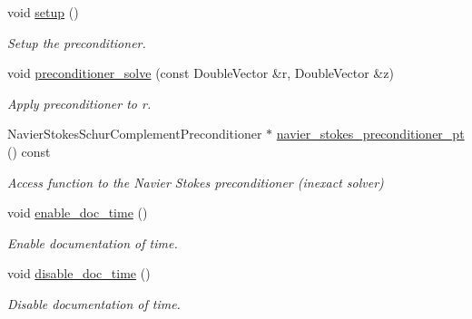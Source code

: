 \begin{DoxyCompactItemize}
void \hyperlink{classoomph_1_1FSIPreconditioner_adadfe9f4332af610b00f1f45d1ad432e}{setup} ()
\begin{DoxyCompactList}\small\item\em Setup the preconditioner. \end{DoxyCompactList}\item 
void \hyperlink{classoomph_1_1FSIPreconditioner_a31c84c3ca19c31488acd0bf2fe333a6b}{preconditioner\+\_\+solve} (const Double\+Vector \&r, Double\+Vector \&z)
\begin{DoxyCompactList}\small\item\em Apply preconditioner to r. \end{DoxyCompactList}\item 
Navier\+Stokes\+Schur\+Complement\+Preconditioner $\ast$ \hyperlink{classoomph_1_1FSIPreconditioner_a8cd1be6bffd5014090350064177c0283}{navier\+\_\+stokes\+\_\+preconditioner\+\_\+pt} () const
\begin{DoxyCompactList}\small\item\em Access function to the Navier Stokes preconditioner (inexact solver) \end{DoxyCompactList}\item 
void \hyperlink{classoomph_1_1FSIPreconditioner_a2836b05d6eb81b807bd53b50dad7d3a0}{enable\+\_\+doc\+\_\+time} ()
\begin{DoxyCompactList}\small\item\em Enable documentation of time. \end{DoxyCompactList}\item 
void \hyperlink{classoomph_1_1FSIPreconditioner_a932cb1cf6a20503a5cbb43a6b67f2340}{disable\+\_\+doc\+\_\+time} ()
\begin{DoxyCompactList}\small\item\em Disable documentation of time. \end{DoxyCompactList}\end{DoxyCompactItemize}
